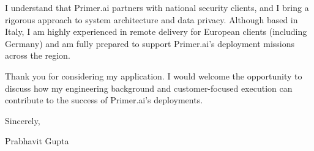 \documentclass[11pt,a4paper]{article}
\begin{document}
I understand that Primer.ai partners with national security clients, and I bring a rigorous approach to system architecture and data privacy. Although based in Italy, I am highly experienced in remote delivery for European clients (including Germany) and am fully prepared to support Primer.ai's deployment missions across the region.

Thank you for considering my application. I would welcome the opportunity to discuss how my engineering background and customer-focused execution can contribute to the success of Primer.ai's deployments.

Sincerely,

Prabhavit Gupta
\end{document}
